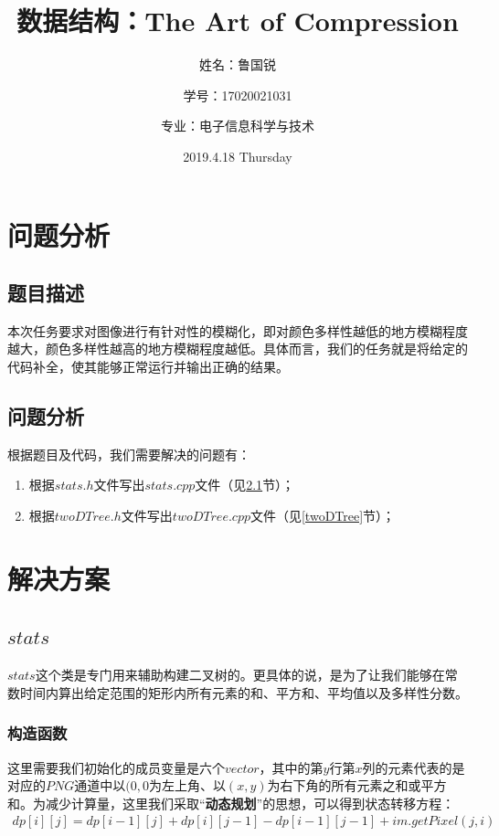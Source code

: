 \documentclass[UTF8]{ctexart}
\title{数据结构：The Art of Compression}
\author{姓名：鲁国锐 \protect\newline
\and 学号：17020021031 \\
\and 专业：电子信息科学与技术}
\date{2019.4.18    Thursday}
\begin{document}
	\maketitle
	\renewcommand{\contentsname}{Contents}
	\tableofcontents
	\newpage
	
	\hypersetup{
	bookmarks=true,
	colorlinks=true,
	linkcolor=red,
	urlcolor=blue
	}
	\section{问题分析}
	\subsection{题目描述}
	\indent 本次任务要求对图像进行有针对性的模糊化，即对颜色多样性越低的地方模糊程度越大，颜色多样性越高的地方模糊程度越低。具体而言，我们的任务就是将给定的代码补全，使其能够正常运行并输出正确的结果。

	\subsection{问题分析}
	\indent 根据题目及代码，我们需要解决的问题有：
	\begin{enumerate}[leftmargin=50pt]
	\item 根据$stats.h$文件写出$stats.cpp$文件（见\ref{stats}节）；
	\item 根据$twoDTree.h$文件写出$twoDTree.cpp$文件（见\ref{twoDTree}节）；
	\end{enumerate}
	

	
	\section{解决方案}
		\subsection{$stats$}\label{stats}
		\indent $stats$这个类是专门用来辅助构建二叉树的。更具体的说，是为了让我们能够在常数时间内算出给定范围的矩形内所有元素的和、平方和、平均值以及多样性分数。
		
			\subsubsection{构造函数}
			\indent 这里需要我们初始化的成员变量是六个$vector$，其中的第$y$行第$x$列的元素代表的是对应的$PNG$通道中以$(0,0$为左上角、以$(x, y)$为右下角的所有元素之和或平方和。为减少计算量，这里我们采取“\textbf{动态规划}”的思想，可以得到状态转移方程：
			\begin{align}
			dp[i][j] = dp[i-1][j] + dp[i][j-1] - dp[i-1][j-1] + im.getPixel(j, i) \label{construction}
			\end{align}
			
\end{document}
